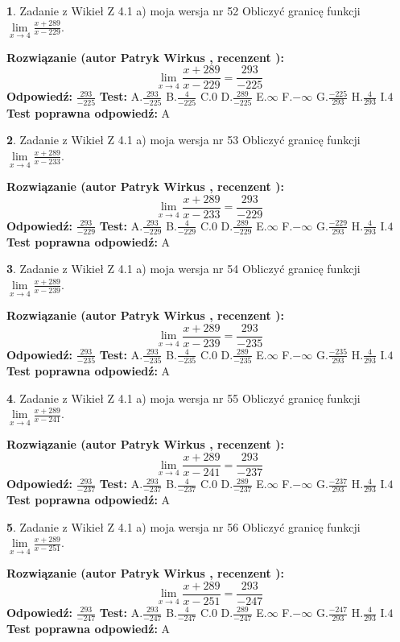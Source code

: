 \documentclass[12pt, a4paper]{article}
\theoremstyle{definition} %
\newtheorem{zad}{}
\newcommand{\zadStart}[1]{\begin{zad}#1\newline}
\newcommand{\zadStop}{\end{zad}}
\newcommand{\rozwStart}[2]{\noindent \textbf{Rozwiązanie (autor #1 , recenzent #2): }\newline}
\newcommand{\rozwStop}{\newline}
\newcommand{\odpStart}{\noindent \textbf{Odpowiedź:}\newline}
\newcommand{\odpStop}{\newline}
\newcommand{\testStart}{\noindent \textbf{Test:}\newline}
\newcommand{\testStop}{\newline}
\newcommand{\kluczStart}{\noindent \textbf{Test poprawna odpowiedź:}\newline}
\newcommand{\kluczStop}{\newline}
\begin{document}
\zadStart{Zadanie z Wikieł Z 4.1 a) moja wersja nr 52}
Obliczyć granicę funkcji $\lim\limits_{x\to4}\frac{x+289}{x-229}$.
\zadStop
\rozwStart{Patryk Wirkus}{}
$$\lim\limits_{x\to4}\frac{x+289}{x-229} = \frac{293}{-225}$$
\rozwStop
\odpStart
$\frac{293}{-225}$
\odpStop
\testStart
A.$\frac{293}{-225}$
B.$\frac{4}{-225}$
C.$0$
D.$\frac{289}{-225}$
E.$\infty$
F.$-\infty$
G.$\frac{-225}{293}$
H.$\frac{4}{293}$
I.$4$
\testStop
\kluczStart
A
\kluczStop



\zadStart{Zadanie z Wikieł Z 4.1 a) moja wersja nr 53}
Obliczyć granicę funkcji $\lim\limits_{x\to4}\frac{x+289}{x-233}$.
\zadStop
\rozwStart{Patryk Wirkus}{}
$$\lim\limits_{x\to4}\frac{x+289}{x-233} = \frac{293}{-229}$$
\rozwStop
\odpStart
$\frac{293}{-229}$
\odpStop
\testStart
A.$\frac{293}{-229}$
B.$\frac{4}{-229}$
C.$0$
D.$\frac{289}{-229}$
E.$\infty$
F.$-\infty$
G.$\frac{-229}{293}$
H.$\frac{4}{293}$
I.$4$
\testStop
\kluczStart
A
\kluczStop



\zadStart{Zadanie z Wikieł Z 4.1 a) moja wersja nr 54}
Obliczyć granicę funkcji $\lim\limits_{x\to4}\frac{x+289}{x-239}$.
\zadStop
\rozwStart{Patryk Wirkus}{}
$$\lim\limits_{x\to4}\frac{x+289}{x-239} = \frac{293}{-235}$$
\rozwStop
\odpStart
$\frac{293}{-235}$
\odpStop
\testStart
A.$\frac{293}{-235}$
B.$\frac{4}{-235}$
C.$0$
D.$\frac{289}{-235}$
E.$\infty$
F.$-\infty$
G.$\frac{-235}{293}$
H.$\frac{4}{293}$
I.$4$
\testStop
\kluczStart
A
\kluczStop



\zadStart{Zadanie z Wikieł Z 4.1 a) moja wersja nr 55}
Obliczyć granicę funkcji $\lim\limits_{x\to4}\frac{x+289}{x-241}$.
\zadStop
\rozwStart{Patryk Wirkus}{}
$$\lim\limits_{x\to4}\frac{x+289}{x-241} = \frac{293}{-237}$$
\rozwStop
\odpStart
$\frac{293}{-237}$
\odpStop
\testStart
A.$\frac{293}{-237}$
B.$\frac{4}{-237}$
C.$0$
D.$\frac{289}{-237}$
E.$\infty$
F.$-\infty$
G.$\frac{-237}{293}$
H.$\frac{4}{293}$
I.$4$
\testStop
\kluczStart
A
\kluczStop



\zadStart{Zadanie z Wikieł Z 4.1 a) moja wersja nr 56}
Obliczyć granicę funkcji $\lim\limits_{x\to4}\frac{x+289}{x-251}$.
\zadStop
\rozwStart{Patryk Wirkus}{}
$$\lim\limits_{x\to4}\frac{x+289}{x-251} = \frac{293}{-247}$$
\rozwStop
\odpStart
$\frac{293}{-247}$
\odpStop
\testStart
A.$\frac{293}{-247}$
B.$\frac{4}{-247}$
C.$0$
D.$\frac{289}{-247}$
E.$\infty$
F.$-\infty$
G.$\frac{-247}{293}$
H.$\frac{4}{293}$
I.$4$
\testStop
\kluczStart
A
\kluczStop
\end{document}
